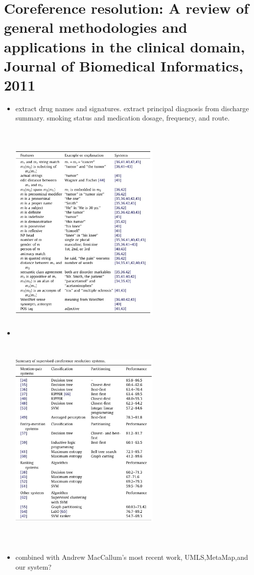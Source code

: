 \documentclass[pdftext,twoside,11pt]{article}
\begin{document}
\section{Coreference resolution: A review of general methodologies and applications
in the clinical domain, Journal of Biomedical Informatics, 2011}
\label{sec:intro} 
\begin{itemize}
\item  extract drug names and signatures. extract principal diagnosis from discharge summary.
       smoking status and medication dosage, frequency, and route.
\item
\begin{center}
      \includegraphics[height=30em,width=20em]{feature.jpg}
      \includegraphics[height=30em,width=20em]{comparision.jpg}
\end{center}

\item   combined with Andrew MacCallum's most recent work, UMLS,MetaMap,and our system? 
\end{itemize}
\end{document}
